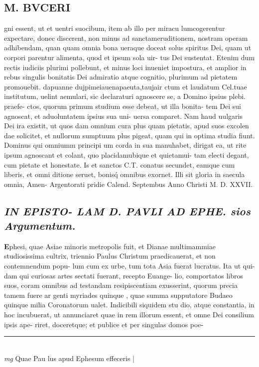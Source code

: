 \documentclass{article}
\begin{document}
\begin{pages}
\section*{M. BVCERI }\pstart gni essent, ut et uentri suocibum, item ab illo per miracu lumcogerentur expectare, donec discerent, non minus ad sanctameruditionem, nostram operam adhibendam, quan quam omnia bona ueraque doceat solus spiritus Dei, quam ut corpori parentur alimenta, quod et ipsum sola uir- tus Dei sustentat. Etenim dum rectis iudiciis plurimi pollebunt, et minus loci inueniet impostura, et amplior in rebus singulis bonitatis Dei admiratio atque cognitio, plurimum ad pietatem promouebit.  \pend\pstart dapuanne dujpimeiauenapaeuta,taujair ctum et laudatum Cel.tuae institutum, uelint aemulari, sic declaraturi agnoscere se, a Domino ipsius plebi. praefe- ctos, quorum primum studium esse debeat, ut illa bonita- tem Dei sui agnoscat, et aduoluntatem ipsius sua uni- uersa comparet. Nam haud uulgaris Dei ira existit, ut quos dam omnium cura plus quam pietatis, apud suos excolen dae solicitet, et nullorum sumptuum plus pigeat, quam qui in optima studia fiunt. Dominus qui omniumm principi um corda in sua manuhabet, dirigat ea, ut rite ipsum agnoscant et colant, quo placidamubique et quietamui- tam electi degant, cum pietate et honestate. Is et sanctos C.T. conatus secundet, eamque cum liberis, et omni ditione seruet, bonisq́ omnibus exornet.  Illi sit gloria in saecula omnia, Amen- Argentorati pridie Calend. Septembus  Anno Christi M. D. XXVII.  \pend
{}
{}
\subsection*{\textit{IN EPISTO- LAM D. PAVLI AD EPHE.  sios Argumentum.  }}\pstart \huge\textbf{E}\normalsize phesi, quae Asiae minoris metropolis fuit, et Dianae multimammiae studiosissima cultrix, triennio Paulus Christum praedicauerat, et non contemnendum popu- lum cum ex urbe, tum tota Asia fuerat lucratus. Ita ut qui- dam qui curiosas artes sectati fuerant, recepto Euange- lio, comportatos libros suos, coram omnibus ad testandam resipiscentiam exusserint, quorum precia tamem fuere ar genti myriades quinque , quae summa supputatore Budaeo quinque milia Coronatorum ualet.  Indicibili siquidem stu dio, atque constantia, in hoc incubuerat, ut annunciaret quae in rem illorum essent, et omne Dei consilium ipsis ape- riret, doceretque; et publice et per singulas domos poe-  \pend
\vspace{0.5cm}\noindent
\vspace{0.2cm}\rule{1cm}{0.2pt}\\ 
\hspace{0.2cm}\textit{mg}
\footnotesize Quae Pau lus apud Ephesum effeceris 
\normalsize| 

\end{pages}
\end{document}
